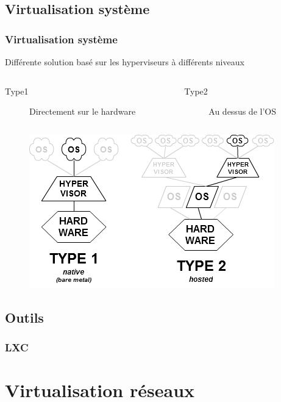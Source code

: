 \documentclass{beamer}
\begin{document}
		\subsection{Virtualisation système}
			\begin{frame}
			  \frametitle{Virtualisation système}
			  Différente solution basé sur les hyperviseurs à différents niveaux
			  \begin{columns}
          \begin{column}{.48\textwidth}
			      \begin{description}
			        \item[Type1] Directement sur le hardware
			      \end{description}
			    \end{column}%
          \hfill%
          \begin{column}{.48\textwidth}
            \begin{description}
			        \item[Type2] Au dessus de l'OS
			      \end{description}
          \end{column}
          \end{columns}
          \begin{figure}
			    \includegraphics[scale=0.5]{img/Hyperviseur.png}
 			  \end{figure}
			\end{frame}
			
		\subsection{Outils}
			\begin{frame}
				\frametitle{LXC}
			\end{frame}
			
			
	\section{Virtualisation réseaux}
	
\end{document}
